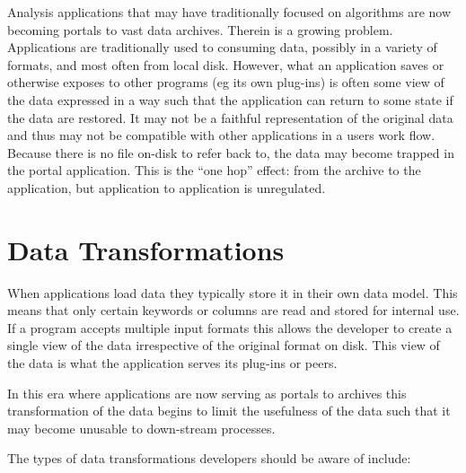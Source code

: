 \documentclass[11pt,twoside]{article}
\begin{document}
Analysis applications that may have traditionally focused on 
algorithms are now becoming portals to vast data archives.  Therein is a
growing problem.  Applications are traditionally used to consuming data, 
possibly in a variety of formats, and most often from local disk.  However, 
what an application saves or otherwise exposes to other programs (eg its own
plug-ins) is often some view of the data expressed in a way such that the
application can return to some state if the data are restored.  It may not be
a faithful representation of the original data and thus may not be 
compatible with other applications in a users work flow.  Because there
is no file on-disk to refer back to, the data may become trapped in the
portal application.  This is the ``one hop'' effect:  from the archive
to the application, but application to application is unregulated.


\section{Data Transformations}

When applications load data they typically store it in their own data model.
This means that only certain keywords or columns are read and stored for
internal use.  If a program accepts multiple input formats this allows the
developer to create a single view of the data irrespective of the
original format on disk.  This view of the data is what the application
serves its plug-ins or peers.

In this era where applications are now serving as portals to archives this 
transformation of the data begins to limit the usefulness of the data such
that it may become unusable to down-stream processes.

The types of data transformations developers should be aware of include:
\end{document}
